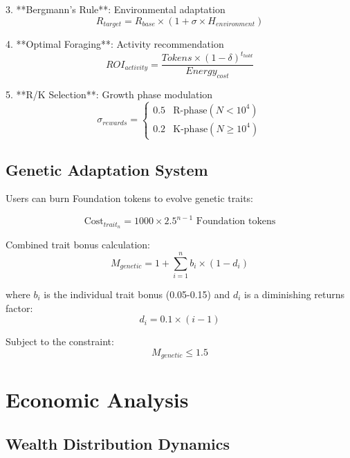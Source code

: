 \documentclass[11pt,letterpaper]{article}
\begin{document}
3. **Bergmann's Rule**: Environmental adaptation
   \begin{equation}
   R_{target} = R_{base} \times (1 + \sigma \times H_{environment})
   \end{equation}

4. **Optimal Foraging**: Activity recommendation
   \begin{equation}
   ROI_{activity} = \frac{Tokens \times (1 - \delta)^{t_{hold}}}{Energy_{cost}}
   \end{equation}

5. **R/K Selection**: Growth phase modulation
   \begin{equation}
   \sigma_{rewards} = \begin{cases}
   0.5 & \text{R-phase} (N < 10^4) \\
   0.2 & \text{K-phase} (N \geq 10^4)
   \end{cases}
   \end{equation}

\subsection{Genetic Adaptation System}

Users can burn Foundation tokens to evolve genetic traits:

\begin{equation}
\text{Cost}_{trait_n} = 1000 \times 2.5^{n-1} \text{ Foundation tokens}
\end{equation}

Combined trait bonus calculation:
\begin{equation}
M_{genetic} = 1 + \sum_{i=1}^{n} b_i \times (1 - d_i)
\end{equation}

where $b_i$ is the individual trait bonus (0.05-0.15) and $d_i$ is a diminishing returns factor:
\begin{equation}
d_i = 0.1 \times (i - 1)
\end{equation}

Subject to the constraint:
\begin{equation}
M_{genetic} \leq 1.5
\end{equation}

\section{Economic Analysis}

\subsection{Wealth Distribution Dynamics}
\end{document}

